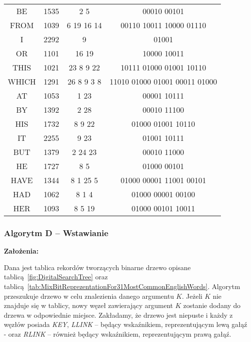 \begin{table}
\begin{threeparttable}
{\begin{tabularx}{0.86\textwidth}{C{3}|C{6}|C{6}|C{14}|}
					BE 		& 1535 		& 2 5 			& 00010 00101 \\
					FROM 	& 1039 		& 6 19 16 14 	& 00110 10011 10000 01110 \\
					I 		& 2292 		& 9 			& 01001 \\
					OR 		& 1101 		& 16 19 		& 10000 10011 \\
					THIS 	& 1021 		& 23 8 9 22 	& 10111 01000 01001 10110 \\
					WHICH 	& 1291 		& 26 8 9 3 8 	& 11010 01000 01001 00011 01000 \\
					AT 		& 1053 		& 1 23 			& 00001 10111 \\
					BY 		& 1392 		& 2 28 			& 00010 11100 \\
					HIS 	& 1732 		& 8 9 22 		& 01000 01001 10110 \\
					IT 		& 2255 		& 9 23 			& 01001 10111 \\
					BUT 	& 1379 		& 2 24 23 		& 00010 11000 \\
					HE 		& 1727 		& 8 5 			& 01000 00101 \\
					HAVE 	& 1344 		& 8 1 25 5 		& 01000 00001 11001 00101 \\ 
					HAD 	& 1062 		& 8 1 4 		& 01000 00001 00100 \\
					HER 	& 1093 		& 8 5 19 		& 01000 00101 10011 \\
				\end{tabularx} 
			}
		\end{threeparttable}
	\end{table}
	
	\subsubsection{Algorytm D -- Wstawianie}\label{sec:AlgorytmD}
	
	\textbf{Założenia:}
	
	Dana jest tablica rekordów tworzących binarne drzewo opisane tablicą~\ref{fig:DigitalSearchTree} oraz tablicą~\ref{tab:MixBitReprezentationFor31MostCommonEnglishWords}. Algorytm przeszukuje drzewo w celu znalezienia danego argumentu $K$. Jeżeli $K$ nie znajduje się w tablicy, nowy węzeł zawierający argument $K$ zostanie dodany do drzewa w odpowiednie miejsce. Zakładamy, że drzewo jest niepuste i każdy z węzłów posiada \emph{KEY}, \emph{LLINK} -- będący wskaźnikiem, reprezentującym lewą gałąź - oraz \emph{RLINK} -- również będący wskaźnikiem, reprezentującym prawą gałąź.
	
